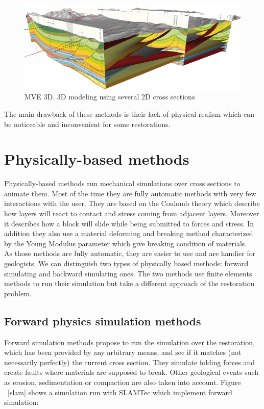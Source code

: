 \documentclass[12pt, a4paper]{report} %
\begin{document}
\begin{figure}[H]
	\centering
	\includegraphics[scale=1]{mve3D.png}
	\caption{MVE 3D. 3D modeling using several 2D cross sections}
	\label{mve3}
\end{figure}
The main drawback of these methods is their lack of physical realism which can be noticeable and inconvenient for some restorations.
\section{Physically-based methods}
Physically-based methods run mechanical simulations over cross sections to animate them. Most of the time they are fully automatic methods with very few interactions with the user. They are based on the Coulomb theory which describe how layers will react to contact and stress coming from  adjacent layers. Moreover it describes how a block will slide while being submitted to forces and stress. In addition they also use a material deforming and breaking method characterized by the Young Modulus parameter which give breaking condition of materials. \\
As those methods are fully automatic, they are easier to use and are handier for geologists.
We can distinguish two types of physically based methods: forward simulating and backward simulating ones.
The two methods use finite elements methods to run their simulation but take a different approach of the restoration problem.
\subsection{Forward physics simulation methods}
Forward simulation methods propose to run the simulation over the restoration, which has been provided by any arbitrary means, and see if it matches (not necessarily perfectly) the current cross section. They simulate folding forces and create faults where materials are supposed to break. Other geological events such as erosion, sedimentation or compaction are also taken into account. Figure ~\ref{slam} shows a simulation run with SLAMTec \cite{SLAMTec} which implement forward simulation:
\end{document}
